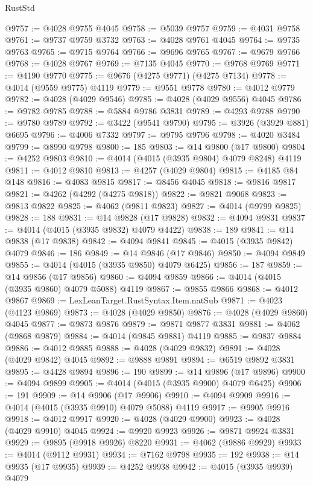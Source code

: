 \begin{lexlean}{RustStd}
\begin{coremodule}
@9757 := @4028 @9755 @4045
@9758 := @5039 @9757
@9759 := @4031 @9758
@9761 := @9737 @9759 @3732
@9763 := @4028 @9761 @4045
@9764 := @9735 @9763
@9765 := @9715 @9764
@9766 := @9696 @9765
@9767 := @9679 @9766
@9768 := @4028 @9767
@9769 := @7135 @4045
@9770 := @9768 @9769
@9771 := @4190 @9770
@9775 := @9676 (@4275 @9771) (@4275 @7134)
@9778 := @4014 (@9559 @9775) @4119
@9779 := @9551 @9778
@9780 := @4012 @9779
@9782 := @4028 (@4029 @9546)
@9785 := @4028 (@4029 @9556) @4045
@9786 := @9782 @9785
@9788 := @5884 @9786 @3831
@9789 := @4293 @9788
@9790 := @9780 @9789
@9792 := @3422 (@9541 @9790)
@9795 := @3926 (@3929 @881) @6695
@9796 := @4006 @7332
@9797 := @9795 @9796
@9798 := @4020 @3484
@9799 := @8990 @9798
@9800 := 185
@9803 := @14 @9800 (@17 @9800)
@9804 := @4252 @9803
@9810 := @4014 (@4015 (@3935 @9804) @4079 @8248) @4119
@9811 := @4012 @9810
@9813 := @4257 (@4029 @9804)
@9815 := @4185 @84 @148
@9816 := @4083 @9815
@9817 := @8456 @4045
@9818 := @9816 @9817
@9821 := @4262 (@4292 (@4275 @9818))
@9822 := @9821 @9068
@9823 := @9813 @9822
@9825 := @4062 (@9811 @9823)
@9827 := @4014 (@9799 @9825)
@9828 := 188
@9831 := @14 @9828 (@17 @9828)
@9832 := @4094 @9831
@9837 := @4014 (@4015 (@3935 @9832) @4079 @4422)
@9838 := 189
@9841 := @14 @9838 (@17 @9838)
@9842 := @4094 @9841
@9845 := @4015 (@3935 @9842) @4079
@9846 := 186
@9849 := @14 @9846 (@17 @9846)
@9850 := @4094 @9849
@9855 := @4014 (@4015 (@3935 @9850) @4079 @6425)
@9856 := 187
@9859 := @14 @9856 (@17 @9856)
@9860 := @4094 @9859
@9866 := @4014 (@4015 (@3935 @9860) @4079 @5088) @4119
@9867 := @9855 @9866
@9868 := @4012 @9867
@9869 := LexLeanTarget.RustSyntax.Item.natSub
@9871 := @4023 (@4123 @9869)
@9873 := @4028 (@4029 @9850)
@9876 := @4028 (@4029 @9860) @4045
@9877 := @9873 @9876
@9879 := @9871 @9877 @3831
@9881 := @4062 (@9868 @9879)
@9884 := @4014 (@9845 @9881) @4119
@9885 := @9837 @9884
@9886 := @4012 @9885
@9888 := @4028 (@4029 @9832)
@9891 := @4028 (@4029 @9842) @4045
@9892 := @9888 @9891
@9894 := @6519 @9892 @3831
@9895 := @4428 @9894
@9896 := 190
@9899 := @14 @9896 (@17 @9896)
@9900 := @4094 @9899
@9905 := @4014 (@4015 (@3935 @9900) @4079 @6425)
@9906 := 191
@9909 := @14 @9906 (@17 @9906)
@9910 := @4094 @9909
@9916 := @4014 (@4015 (@3935 @9910) @4079 @5088) @4119
@9917 := @9905 @9916
@9918 := @4012 @9917
@9920 := @4028 (@4029 @9900)
@9923 := @4028 (@4029 @9910) @4045
@9924 := @9920 @9923
@9926 := @9871 @9924 @3831
@9929 := @9895 (@9918 @9926) @8220
@9931 := @4062 (@9886 @9929)
@9933 := @4014 (@9112 @9931)
@9934 := @7162 @9798
@9935 := 192
@9938 := @14 @9935 (@17 @9935)
@9939 := @4252 @9938
@9942 := @4015 (@3935 @9939) @4079

\end{coremodule}
\end{lexlean}
